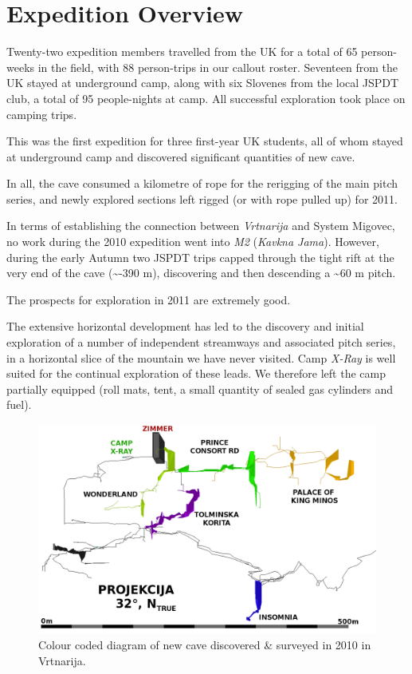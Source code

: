 

\section{Expedition Overview}

Twenty-two expedition members travelled from the UK for a total of 65
person-weeks in the field, with 88 person-trips in our callout roster.
Seventeen from the UK stayed at underground camp, along with six
Slovenes from the local JSPDT club, a total of 95 people-nights at camp.
All successful exploration took place on camping trips.

This was the first expedition for three first-year UK students, all of
whom stayed at underground camp and discovered significant quantities of
new cave.

In all, the cave consumed a kilometre of rope for the rerigging of the
main pitch series, and newly explored sections left rigged (or with rope
pulled up) for 2011.

In terms of establishing the connection between \emph{Vrtnarija} and
System Migovec, no work during the 2010 expedition went into \emph{M2}
(\emph{Kavkna Jama}). However, during the early Autumn two JSPDT trips
capped through the tight rift at the very end of the cave
(\textasciitilde -390 m), discovering and then descending a
\textasciitilde 60 m pitch.

The prospects for exploration in 2011 are extremely good.

The extensive horizontal development has led to the discovery and
initial exploration of a number of independent streamways and associated
pitch series, in a horizontal slice of the mountain we have never
visited. Camp \emph{X-Ray} is well suited for the continual exploration
of these leads. We therefore left the camp partially equipped (roll
mats, tent, a small quantity of sealed gas cylinders and fuel).

\begin{figure}
\includegraphics[width=0.85\columnwidth]{2010/overview/2010_deep_vrtnarija_colour_coded_inverted_labelled.png}
\caption{Colour coded diagram of new cave discovered \& surveyed in 2010 in
Vrtnarija.}
\end{figure}
